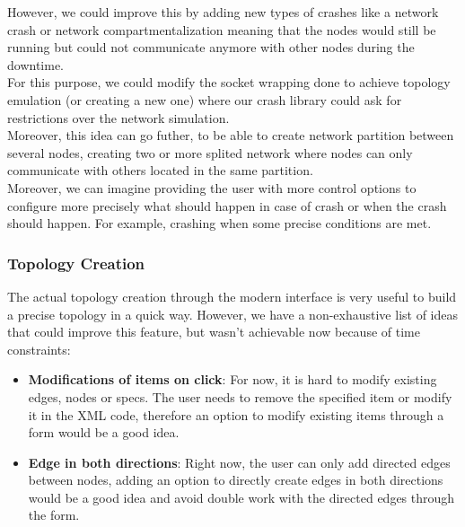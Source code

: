 \documentclass{eplmastersthesis}
\begin{document}
          However, we could improve this by adding new types of crashes like a
          network crash or network compartmentalization meaning that the
          nodes would still be running but could not communicate anymore
          with other nodes during the downtime.\\
          For this purpose, we could modify the socket wrapping done to achieve
          topology emulation (or creating a new one) where our crash library could ask
          for restrictions over the network simulation.\\
          Moreover, this idea can go futher, to be able to create network partition between
          several nodes, creating two or more splited network where nodes can
          only communicate with others located in the same partition.\\

          Moreover, we can imagine providing the user with more control options
          to configure more precisely what should happen in case of crash or
          when the crash should happen. For example, crashing when some
          precise conditions are met.

        \subsubsection{Topology Creation}

          The actual topology creation through the modern interface is very
          useful to build a precise topology in a quick way. However, we have
          a non-exhaustive list of ideas that could improve this feature, but
          wasn't achievable now because of time constraints:

          \begin{itemize}
            \item \textbf{Modifications of items on click}: For now, it is hard
            to modify existing edges, nodes or specs. The user needs to remove
            the specified item or modify it in the XML code, therefore
            an option to modify existing items through a form would be a good
            idea.
            \item \textbf{Edge in both directions}: Right now, the user can only
            add directed edges between nodes, adding an option to directly
            create edges in both directions would be a good idea and
            avoid double work with the directed edges through the form.
          \end{itemize}
\end{document}
